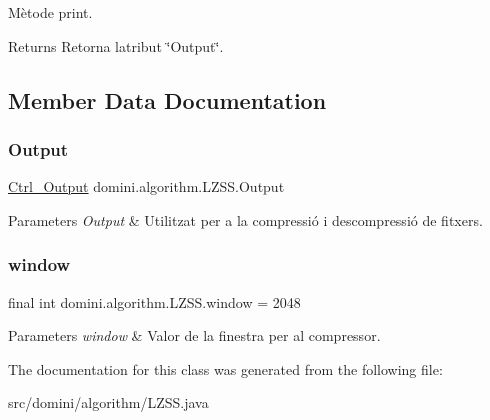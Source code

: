 Mètode print. 

\begin{DoxyReturn}{Returns}
Retorna l\textquotesingle{}atribut \char`\"{}\+Output\char`\"{}. 
\end{DoxyReturn}


\subsection{Member Data Documentation}
\mbox{\label{classdomini_1_1algorithm_1_1LZSS_ab15cbc33a0590c2ac42127ca16821fef}} 
\subsubsection{\texorpdfstring{Output}{Output}}
{\footnotesize\ttfamily \hyperlink{classpersistencia_1_1output_1_1Ctrl__Output}{Ctrl\+\_\+\+Output} domini.\+algorithm.\+L\+Z\+S\+S.\+Output\hspace{0.3cm}{\ttfamily [private]}}


\begin{DoxyParams}{Parameters}
{\em Output} & Utilitzat per a la compressió i descompressió de fitxers. \\
\hline
\end{DoxyParams}
\mbox{\label{classdomini_1_1algorithm_1_1LZSS_a00d9f2e9bc2baa39513fad040b8e7123}} 
\subsubsection{\texorpdfstring{window}{window}}
{\footnotesize\ttfamily final int domini.\+algorithm.\+L\+Z\+S\+S.\+window = 2048\hspace{0.3cm}{\ttfamily [private]}}


\begin{DoxyParams}{Parameters}
{\em window} & Valor de la finestra per al compressor. \\
\hline
\end{DoxyParams}


The documentation for this class was generated from the following file\+:\begin{DoxyCompactItemize}
\item 
src/domini/algorithm/L\+Z\+S\+S.\+java\end{DoxyCompactItemize}
